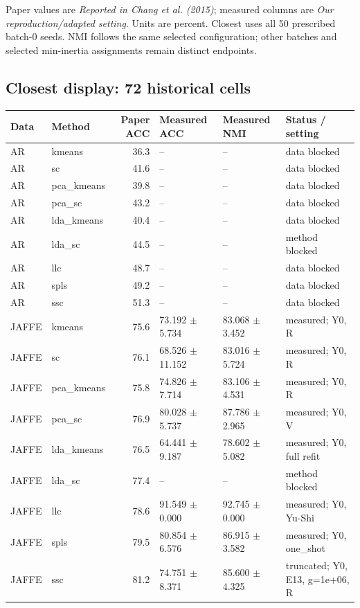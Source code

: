 Paper values are \emph{Reported in Chang et al. (2015)}; measured columns are \emph{Our reproduction/adapted setting}. Units are percent. Closest uses all 50 prescribed batch-0 seeds. NMI follows the same selected configuration; other batches and selected min-inertia assignments remain distinct endpoints.
\small
\subsection{Closest display: 72 historical cells}
\begin{longtable}{llrllp{2.9cm}}
\toprule Data & Method & Paper ACC & Measured ACC & Measured NMI & Status / setting \\
\midrule\endhead
AR & kmeans & 36.3 & -- & -- & data blocked \\
AR & sc & 41.6 & -- & -- & data blocked \\
AR & pca\_kmeans & 39.8 & -- & -- & data blocked \\
AR & pca\_sc & 43.2 & -- & -- & data blocked \\
AR & lda\_kmeans & 40.4 & -- & -- & data blocked \\
AR & lda\_sc & 44.5 & -- & -- & method blocked \\
AR & llc & 48.7 & -- & -- & data blocked \\
AR & spls & 49.2 & -- & -- & data blocked \\
AR & ssc & 51.3 & -- & -- & data blocked \\
JAFFE & kmeans & 75.6 & 73.192 $\pm$ 5.734 & 83.068 $\pm$ 3.452 & measured; Y0, R \\
JAFFE & sc & 76.1 & 68.526 $\pm$ 11.152 & 83.016 $\pm$ 5.724 & measured; Y0, R \\
JAFFE & pca\_kmeans & 75.8 & 74.826 $\pm$ 7.714 & 83.106 $\pm$ 4.531 & measured; Y0, R \\
JAFFE & pca\_sc & 76.9 & 80.028 $\pm$ 5.737 & 87.786 $\pm$ 2.965 & measured; Y0, V \\
JAFFE & lda\_kmeans & 76.5 & 64.441 $\pm$ 9.187 & 78.602 $\pm$ 5.082 & measured; Y0, full refit \\
JAFFE & lda\_sc & 77.4 & -- & -- & method blocked \\
JAFFE & llc & 78.6 & 91.549 $\pm$ 0.000 & 92.745 $\pm$ 0.000 & measured; Y0, Yu-Shi \\
JAFFE & spls & 79.5 & 80.854 $\pm$ 6.576 & 86.915 $\pm$ 3.582 & measured; Y0, one\_shot \\
JAFFE & ssc & 81.2 & 74.751 $\pm$ 8.371 & 85.600 $\pm$ 4.325 & truncated; Y0, E13, g=1e+06, R \\

\end{longtable}
